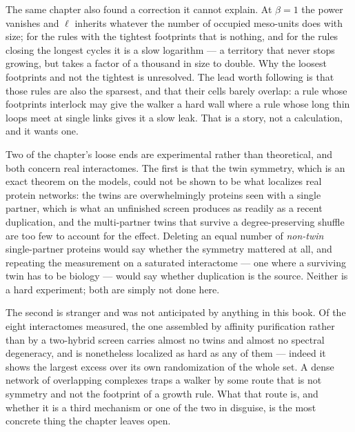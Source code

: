 The same chapter also found a correction it cannot explain. At $\beta=1$ the power
vanishes and $\ell$ inherits whatever the number of occupied meso-units does with size;
for the rules with the tightest footprints that is nothing, and for the rules closing
the longest cycles it is a slow logarithm --- a territory that never stops growing, but
takes a factor of a thousand in size to double. Why the loosest footprints and not the
tightest is unresolved. The lead worth following is that those rules are also the
sparsest, and that their cells barely overlap: a rule whose footprints interlock may
give the walker a hard wall where a rule whose long thin loops meet at single links
gives it a slow leak. That is a story, not a calculation, and it wants one.

Two of the chapter's loose ends are experimental rather than theoretical, and both
concern real interactomes. The first is that the twin symmetry, which is an exact
theorem on the models, could not be shown to be what localizes real protein networks:
the twins are overwhelmingly proteins seen with a single partner, which is what an
unfinished screen produces as readily as a recent duplication, and the multi-partner
twins that survive a degree-preserving shuffle are too few to account for the effect.
Deleting an equal number of \emph{non-twin} single-partner proteins would say whether
the symmetry mattered at all, and repeating the measurement on a saturated interactome
--- one where a surviving twin has to be biology --- would say whether duplication is
the source. Neither is a hard experiment; both are simply not done here.

The second is stranger and was not anticipated by anything in this book. Of the eight
interactomes measured, the one assembled by affinity purification rather than by a
two-hybrid screen carries almost no twins and almost no spectral degeneracy, and is
nonetheless localized as hard as any of them --- indeed it shows the largest excess over
its own randomization of the whole set. A dense network of overlapping complexes traps a
walker by some route that is not symmetry and not the footprint of a growth rule. What
that route is, and whether it is a third mechanism or one of the two in disguise, is the
most concrete thing the chapter leaves open.

